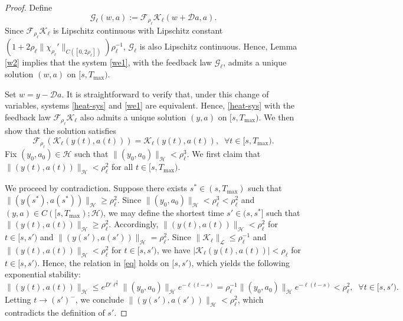 \documentclass[a4paper]{article}
\numberwithin{equation}{section}
\begin{document}
\begin{appendices}
\begin{proof}
Define
\begin{equation}\label{Gfeed-new}
\mathcal G_\ell(w,a):=\mathcal F_{\rho_\ell}\mathcal K_\ell(w+\mathcal Da,a).
\end{equation}
Since $\mathcal{F}_{\rho_{\ell}}\mathcal{K}_{\ell}$ is Lipschitz continuous with Lipschitz constant $(1+2{\rho_{\ell}}\|\chi_{\rho_{\ell}}'\|_{C([0,2\rho_{\ell}])})\rho_{\ell}^{-1}$, $\mathcal G_\ell$ is also Lipschitz continuous. Hence, Lemma \ref{w2} implies that the system \eqref{we1}, with the feedback law $\mathcal G_\ell$, admits a unique solution $(w,a)$ on $[s,T_{\max})$.

Set $w=y-\mathcal D a$. It is straightforward to verify that, under this change of variables, systems \eqref{heat-sys} and \eqref{we1} are equivalent. Hence, \eqref{heat-sys} with the feedback law $\mathcal{F}_{\rho_{\ell}}\mathcal{K}_{\ell}$ also admits a unique solution $(y,a)$ on $[s,T_{\max})$. We then show that the solution satisfies
\begin{equation}\label{eq}
\mathcal{F}_{\rho_{\ell}}(\mathcal{K}_{\ell}(y(t),a(t)))=\mathcal{K}_{\ell}(y(t),a(t)),\;\;\forall  t\in [s,T_{\max}).
\end{equation}
Fix $(y_0,a_0)\in \mathcal{H}$ such that
$\| (y_0,a_0)\|_{\mathcal{H}}<\rho_{\ell}^3$. We first claim that $\| (y(t),a(t))\|_{\mathcal{H}}< \rho_{\ell}^2$ for all $t\in [s,T_{\max})$.
	
We proceed by contradiction. Suppose there exists $s^*\in (s,T_{\max})$ such that $\|(y(s^*),a(s^*))\|_{\mathcal{H}}\ge \rho_{\ell}^2$.
Since $\| (y_0,a_0)\|_{\mathcal{H}}<\rho_{\ell}^3<\rho_{\ell}^2$ and $(y,a)\in C([s,T_{\max});\mathcal{H})$, we may define the shortest time $s'\in(s,s^*]$ such that $\| (y(t),a(t))\|_{\mathcal{H}}\ge \rho_{\ell}^2$. Accordingly,
$\| (y(t),a(t))\|_{\mathcal{H}}<  \rho_{\ell}^2$ for $t\in [s,s')$ and $\| (y(s'),a(s'))\|_{\mathcal{H}}=\rho_{\ell}^2$. Since $\|\mathcal K_\ell\|_{\mathcal L}\le\rho_\ell^{-1}$ and $\|(y(t),a(t))\|_{\mathcal H}<\rho_\ell^2$ for $t\in[s,s')$, we have $|\mathcal K_\ell(y(t),a(t))|<\rho_\ell$ for $t\in [s,s')$. Hence, the relation in \eqref{eq} holds on $[s,s')$, which yields the following exponential stability:
$$\| (y(t),a(t))\|_{\mathcal{H}}\le e^{D'{\ell}^{\frac{2}{3}}}\| (y_0,a_0)\|_{\mathcal{H}}e^{-\ell(t-s)}=\rho_{\ell}^{-1}\| (y_0,a_0)\|_{\mathcal{H}}e^{-\ell(t-s)}<\rho_{\ell}^2, \;\; \forall t\in [s,s').$$
Letting $t\to (s')^-$, we conclude $\| (y(s'),a(s'))\|_{\mathcal{H}}<\rho_{\ell}^2$, which contradicts the definition of $s'$. 


\end{proof}
\end{appendices}
\end{document}

